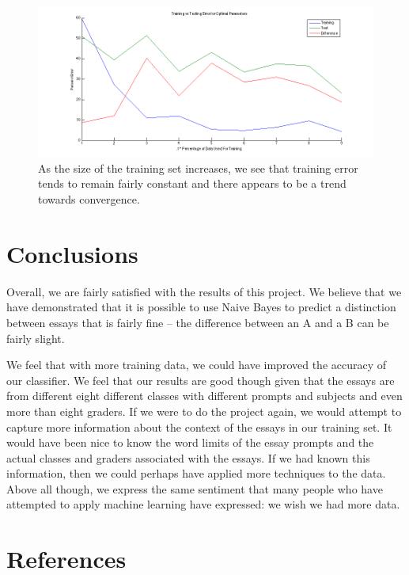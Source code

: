 \documentclass[11pt,acticle]{scrartcl}
\begin{document}
\begin{figure}[H]
\includegraphics[scale=0.5]{error.png}
\caption{As the size of the training set increases, we see that training error tends to remain fairly constant and there appears to be a trend towards convergence.}
\end{figure}

\begin{multicols}{2}

\section{Conclusions}

Overall, we are fairly satisfied with the results of this project. We believe that we have demonstrated that it is possible to use Naive Bayes to predict a distinction between essays that is fairly fine -- the difference between an A and a B can be fairly slight.

We feel that with more training data, we could have improved the accuracy of our classifier. We feel that our results are good though given that the essays are from different eight different classes with different prompts and subjects and even more than eight graders. If we were to do the project again, we would attempt to capture more information about the context of the essays in our training set. It would have been nice to know the word limits of the essay prompts and the actual classes and graders associated with the essays. If we had known this information, then we could perhaps have applied more techniques to the data. Above all though, we express the same sentiment that many people who have attempted to apply machine learning have expressed: we wish we had more data.

\section{References}
\theendnotes
\end{multicols}
    
\end{document}

